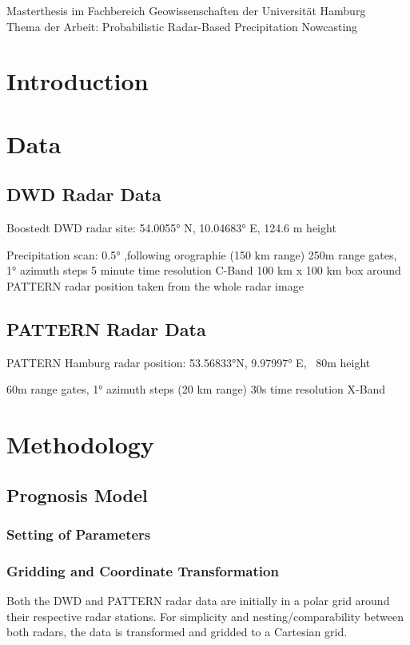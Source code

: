 \documentclass[11pt,twoside,a4paper,fleqn]{report}
\numberwithin{equation}{chapter}
\numberwithin{figure}{chapter}
\numberwithin{table}{chapter}
\begin{document}
	\newpage
	\thispagestyle{empty}
	\null
	\vfill
	Masterthesis im Fachbereich Geowissenschaften der Universität Hamburg\\
	Thema der Arbeit: \glqq Probabilistic Radar-Based Precipitation Nowcasting\grqq
	
	
\newpage
\renewcommand{\abstractname}{\huge \flushleft Abstract}
\begin{abstract}
\null
\end{abstract}
\thispagestyle{empty}
\pagestyle{empty}
\tableofcontents
\listoffigures
\listoftables
\newpage\pagestyle{fancy}
\chapter{Introduction}
\chapter{Data}
\section{DWD Radar Data}
Boostedt DWD radar site: 54.0055° N, 10.04683° E, 124.6 m height

Precipitation scan: 0.5° ,following orographie (150 km range)
250m range gates, 1° azimuth steps
5 minute time resolution
C-Band
100 km x 100 km box around PATTERN radar position taken from the whole radar image
\section{PATTERN Radar Data}
PATTERN Hamburg radar position: 53.56833°N, 9.97997° E, ~80m height

60m range gates, 1° azimuth steps (20 km range)
30s time resolution
X-Band
\chapter{Methodology}
\section{Prognosis Model}
\subsection{Setting of Parameters}
\subsection{Gridding and Coordinate Transformation}
Both the DWD and PATTERN radar data are initially in a polar grid around their respective radar stations. For simplicity and nesting/comparability between both radars, the data is transformed and gridded to a Cartesian grid. 
\end{document}
